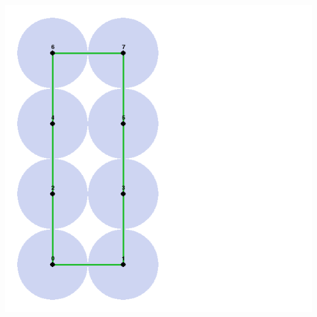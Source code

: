 \documentclass[11pt,a4paper]{article}
\begin{document}
\includegraphics[width=\textwidth]{graph3.png}




\end{document}
